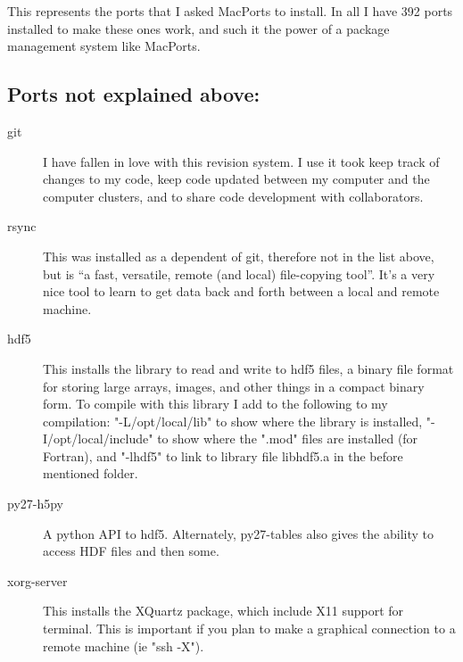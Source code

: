 \documentclass[11pt]{article}
\begin{document}
This represents the ports that I asked MacPorts to install. In all I have 392 ports installed to make these ones work, and such it the power of a package management system like MacPorts. 

\subsection*{Ports not explained above:}
\begin{description}
	\item[git] I have fallen in love with this revision system. I use it took keep track of changes to my code, keep code updated between my computer and the computer clusters, and to share code development with collaborators.
	\item[rsync] This was installed as a dependent of git, therefore not in the list above, but is ``a fast, versatile, remote (and local) file-copying tool''. It's a very nice tool to learn to get data back and forth between a local and remote machine.
	\item[hdf5] This installs the library to read and write to hdf5 files, a binary file format for storing large arrays, images, and other things in a compact binary form. To compile with this library I add to the following to my compilation: "-L/opt/local/lib" to show where the library is installed, "-I/opt/local/include" to show where the ".mod" files are installed (for Fortran), and "-lhdf5" to link to library file libhdf5.a in the before mentioned folder. 
	\item[py27-h5py] A python API to hdf5. Alternately, py27-tables also gives the ability to access HDF files and then some.
	\item[xorg-server] This installs the XQuartz package, which include X11 support for terminal. This is important if you plan to make a graphical connection to a remote machine (ie "ssh -X"). 
\end{description}

%
%
\end{document}
